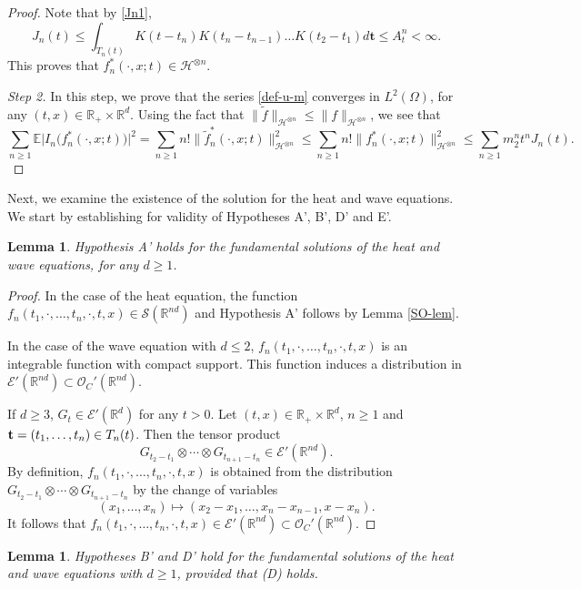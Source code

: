 \documentclass[12pt]{article}
\newtheorem{lemma}[theorem]{Lemma}
\def\cE{\mathcal{E}}
\def\cH{\mathcal{H}}
\def\cO{\mathcal{O}}
\def\cS{\mathcal{S}}
\def\bE{\mathbb{E}}
\def\bR{\mathbb{R}}
\def\bt{{\bf t}}
\begin{document}
\begin{proof}
Note that by \eqref{Jn1},
\[
J_n(t) \leq  \int_{T_n(t)} K(t-t_n) K(t_n-t_{n-1}) \ldots K(t_2-t_1)  d\pmb{t}  \leq
 A_t^n<\infty.
\]
This proves that $f_n^*(\cdot,x;t) \in \cH^{\otimes n}$.

\medskip

{\em Step 2.} In this step, we prove that the series \eqref{def-u-m} converges in $L^2(\Omega)$, for any $(t,x)\in \bR_{+} \times \bR^d$.
Using the fact that $\|\widetilde{f}\|_{\cH^{\otimes n}} \leq \|f\|_{\cH^{\otimes n}}$, we see that
\[
\sum_{n\geq 1}\bE\big|I_n\big(f_n^*(\cdot,x;t)\big)\big|^2 =\sum_{n\geq 1}n! \|\widetilde{f}_n^*(\cdot,x;t)\|_{\cH^{\otimes n}}^2 \leq \sum_{n\geq 1}n! \|f_n^*(\cdot,x;t)\|_{\cH^{\otimes n}}^2 \leq \sum_{n\geq 1} m_2^n t^n J_n(t).
\]

\end{proof}


Next, we examine the existence of the solution for the heat and wave equations. We start by establishing for validity of Hypotheses A', B', D' and E'. 

\begin{lemma}
Hypothesis A' holds for the fundamental solutions of the heat and wave equations, for any $d\geq 1$.
\end{lemma}

\begin{proof}
In the case of the heat equation, the function $f_n(t_1,\cdot,\ldots,t_n,\cdot,t,x)\in \cS(\bR^{nd})$ and Hypothesis A' follows by Lemma \ref{SO-lem}.

In the case of the wave equation with $d\leq 2$, $f_n(t_1,\cdot,\ldots,t_n,\cdot,t,x)$ is an integrable function with compact support. This function induces a distribution in $\cE'(\bR^{nd}) \subset \cO_{C}'(\bR^{nd})$.

 If $d\geq 3$, $G_t\in \cE'(\bR^d)$ for any $t>0$. Let $(t,x)\in \bR_+\times \bR^d$, $n\geq 1$ and
$\bt=(t_1,\ldots,t_n)\in T_n(t)$. Then the tensor product
\[
G_{t_2-t_1}\otimes \cdots \otimes G_{t_{n+1}-t_n}\in \cE'(\bR^{nd}).
\]
By definition, $f_n(t_1,\cdot,\ldots,t_n,\cdot,t,x)$ is obtained from the distribution 
$ G_{t_2-t_1}\otimes \cdots \otimes G_{t_{n+1}-t_n}$ by the change of variables
\[
(x_1,\ldots,x_n)\mapsto (x_2-x_1,\ldots,x_n-x_{n-1},x-x_n).
\]
It follows that $f_n(t_1,\cdot,\ldots,t_n,\cdot,t,x)\in \cE'(\bR^{nd})\subset \mathcal O_C'(\bR^{nd})$.

\end{proof}




\begin{lemma}
\label{lem-hypB'}
Hypotheses B' and D' hold for the fundamental solutions of the heat and wave equations with $d\geq 1$, provided that (D) holds.
\end{lemma}
\end{document}
